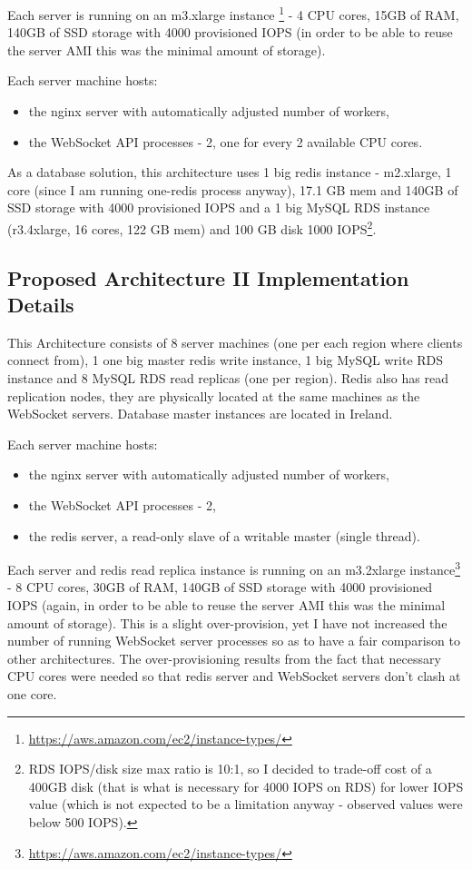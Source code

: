 \documentclass{uvamscse}
\begin{document}
Each server is running on an m3.xlarge instance \footnote{\url{https://aws.amazon.com/ec2/instance-types/}} - 4 CPU cores, 15GB of RAM, 140GB of SSD storage with 4000 provisioned IOPS (in order to be able to reuse the server AMI this was the minimal amount of storage).

Each server machine hosts:
\begin{itemize}
  \item the nginx server with automatically adjusted number of workers,
  \item the WebSocket API processes - 2, one for every 2 available CPU cores.
\end{itemize}

As a database solution, this architecture uses 1 big redis instance - m2.xlarge, 1 core (since I am running one-redis process anyway), 17.1 GB mem and 140GB of SSD storage with 4000 provisioned IOPS and a 1 big MySQL RDS instance (r3.4xlarge, 16 cores, 122 GB mem) and 100 GB disk 1000 IOPS\footnote{RDS IOPS/disk size max ratio is 10:1, so I decided to trade-off cost of a 400GB disk (that is what is necessary for 4000 IOPS on RDS) for lower IOPS value (which is not expected to be a limitation anyway - observed values were below 500 IOPS).}.

\subsection{Proposed Architecture II Implementation Details}\label{Proposed Architecture II Implementation Details}

This Architecture consists of 8 server machines (one per each region where clients connect from), 1 one big master redis write instance, 1 big MySQL write RDS instance and 8 MySQL RDS read replicas (one per region). Redis also has read replication nodes, they are physically located at the same machines as the WebSocket servers. Database master instances are located in Ireland.

Each server machine hosts:
\begin{itemize}
  \item the nginx server with automatically adjusted number of workers,
  \item the WebSocket API processes - 2,
  \item the redis server, a read-only slave of a writable master (single thread).
\end{itemize}

Each server and redis read replica instance is running on an m3.2xlarge instance\footnote{\url{https://aws.amazon.com/ec2/instance-types/}} - 8 CPU cores, 30GB of RAM, 140GB of SSD storage with 4000 provisioned IOPS (again, in order to be able to reuse the server AMI this was the minimal amount of storage). This is a slight over-provision, yet I have not increased the number of running WebSocket server processes so as to have a fair comparison to other architectures. The over-provisioning results from the fact that necessary CPU cores were needed so that redis server and WebSocket servers don't clash at one core.
\end{document}
